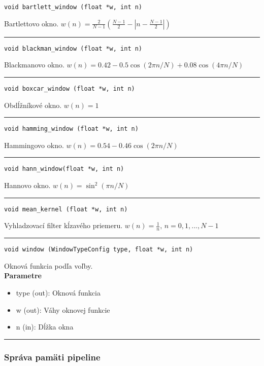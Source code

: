 \begin{lstlisting}[style=docs]
void bartlett_window (float *w, int n)
\end{lstlisting}
   Bartlettovo okno. $w(n) = \frac{2}{N - 1}\left(\frac{N - 1}{2} - \left|n - \frac{N - 1}{2} \right|\right)$
\bigbreak
\hrule

\begin{lstlisting}[style=docs]
void blackman_window (float *w, int n)
\end{lstlisting}
   Blackmanovo okno. $w(n) = 0.42 - 0.5\cos(2\pi n / N) + 0.08\cos(4\pi n / N)$
\bigbreak
\hrule

\begin{lstlisting}[style=docs]
void boxcar_window (float *w, int n)
\end{lstlisting}
   Obdĺžníkové okno.  $w(n) = 1 $
\bigbreak
\hrule

\begin{lstlisting}[style=docs]
void hamming_window (float *w, int n)
\end{lstlisting}
   Hammingovo okno.  $w(n) = 0.54 - 0.46\cos(2\pi n / N)$
\bigbreak
\hrule

\begin{lstlisting}[style=docs]
void hann_window(float *w, int n)
\end{lstlisting}
   Hannovo okno.  $w(n) = \sin^2(\pi n / N)$
\bigbreak
\hrule

\begin{lstlisting}[style=docs]
void mean_kernel (float *w, int n)
\end{lstlisting}
   Vyhladzovací filter kĺzavého priemeru.  $w(n) = \frac{1}{n},\, n = 0, 1, ..., N - 1$
\bigbreak
\hrule

\begin{lstlisting}[style=docs]
void window (WindowTypeConfig type, float *w, int n)
\end{lstlisting}
   Oknová funkcia podľa voľby. \\ 
\textbf{Parametre}
\begin{itemize}[noitemsep, topsep=0pt]
	\item type (out): Oknová funkcia
	\item w (out): Váhy oknovej funkcie
	\item n (in): Dĺžka okna  
\end{itemize}
\bigbreak
\hrule

\subsubsection*{Správa pamäti pipeline}

